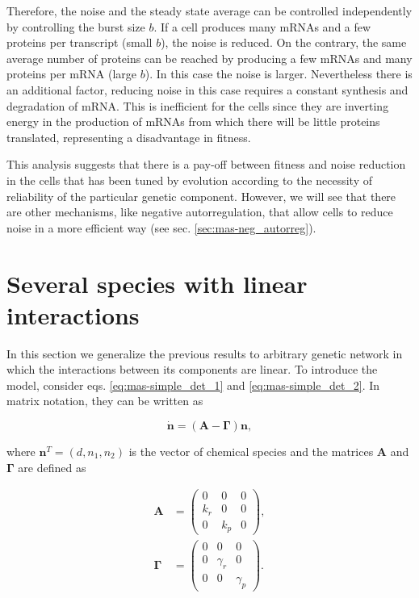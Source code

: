 Therefore, the noise and the steady state average can be controlled independently by controlling the burst size $b$. If a cell produces many mRNAs and a few proteins per transcript (small $b$), the noise is reduced. On the contrary, the same average number of proteins can be reached by producing a few mRNAs and many proteins per mRNA (large $b$). In this case the noise is larger. Nevertheless there is an additional factor, reducing noise in this case requires a constant synthesis and degradation of mRNA. This is inefficient for the cells since they are inverting energy in the production of mRNAs from which there will be little proteins translated, representing a disadvantage in fitness. 

This analysis suggests that there is a pay-off between fitness and noise reduction in the cells that has been tuned by evolution according to the necessity of reliability of the particular genetic component. However, we will see that there are other mechanisms, like negative autorregulation, that allow cells to reduce noise in a more efficient way (see sec. \ref{sec:mas-neg_autorreg}).

\section{Several species with linear interactions}

In this section we generalize the previous results to arbitrary genetic network in which the interactions between its components are linear. To introduce the model, consider eqs. \eqref{eq:mas-simple_det_1} and \eqref{eq:mas-simple_det_2}. In matrix notation, they can be written as

\begin{equation}
  \label{eq:matdet}
  \mathbf{\dot{n}} = \left( \mathbf{A} - \mathbf{\Gamma} \right) \mathbf{n},
\end{equation}

where $\mathbf{n}^T=(d,n_1,n_2)$ is the vector of chemical species and the matrices $\mathbf{A}$ and $\mathbf{\Gamma}$ are defined as

\begin{align}
  \mathbf{A} &=
  \begin{pmatrix}
    0 & 0 & 0 \\
    k_r & 0 & 0 \\
    0 & k_p & 0
  \end{pmatrix} \label{eq:mas_A_single},\\
  \mathbf{\Gamma} &=
  \begin{pmatrix}
    0 & 0 & 0 \\
    0 & \gamma_r & 0 \\
    0 & 0 & \gamma_p 
  \end{pmatrix} \label{eq:mas_G_single}. 
\end{align}


